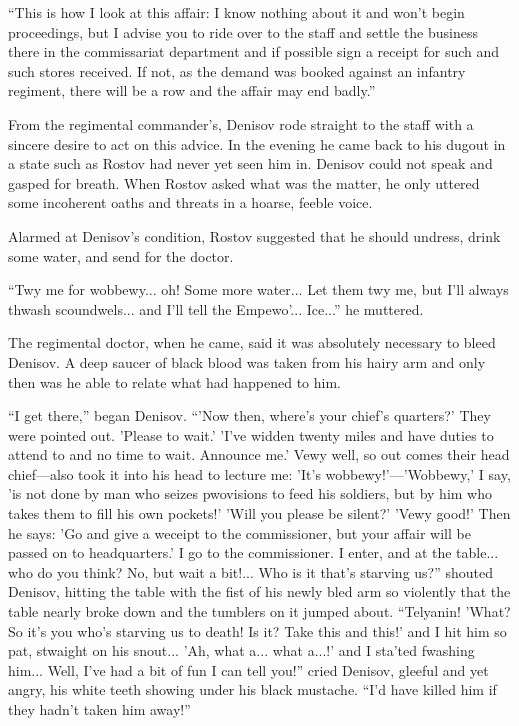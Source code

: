 ``This is how I look at this affair: I know nothing about it and
won't begin proceedings, but I advise you to ride over to the
staff and settle the business there in the commissariat
department and if possible sign a receipt for such and such
stores received. If not, as the demand was booked against an
infantry regiment, there will be a row and the affair may end
badly.''

From the regimental commander's, Denisov rode straight to the
staff with a sincere desire to act on this advice. In the evening
he came back to his dugout in a state such as Rostov had never
yet seen him in. Denisov could not speak and gasped for
breath. When Rostov asked what was the matter, he only uttered
some incoherent oaths and threats in a hoarse, feeble voice.

Alarmed at Denisov's condition, Rostov suggested that he should
undress, drink some water, and send for the doctor.

``Twy me for wobbewy... oh! Some more water... Let them twy me,
but I'll always thwash scoundwels... and I'll tell the
Empewo'... Ice...'' he muttered.

The regimental doctor, when he came, said it was absolutely
necessary to bleed Denisov. A deep saucer of black blood was
taken from his hairy arm and only then was he able to relate what
had happened to him.

``I get there,'' began Denisov. ``'Now then, where's your chief's
quarters?' They were pointed out. 'Please to wait.' 'I've widden
twenty miles and have duties to attend to and no time to
wait. Announce me.'  Vewy well, so out comes their head
chief---also took it into his head to lecture me: 'It's
wobbewy!'---'Wobbewy,' I say, 'is not done by man who seizes
pwovisions to feed his soldiers, but by him who takes them to
fill his own pockets!' 'Will you please be silent?' 'Vewy good!'
Then he says: 'Go and give a weceipt to the commissioner, but
your affair will be passed on to headquarters.' I go to the
commissioner. I enter, and at the table... who do you think? No,
but wait a bit!... Who is it that's starving us?'' shouted
Denisov, hitting the table with the fist of his newly bled arm so
violently that the table nearly broke down and the tumblers on it
jumped about. ``Telyanin! 'What? So it's you who's starving us to
death! Is it? Take this and this!' and I hit him so pat, stwaight
on his snout... 'Ah, what a... what a...!' and I sta'ted fwashing
him... Well, I've had a bit of fun I can tell you!'' cried
Denisov, gleeful and yet angry, his white teeth showing under his
black mustache. ``I'd have killed him if they hadn't taken him
away!''

